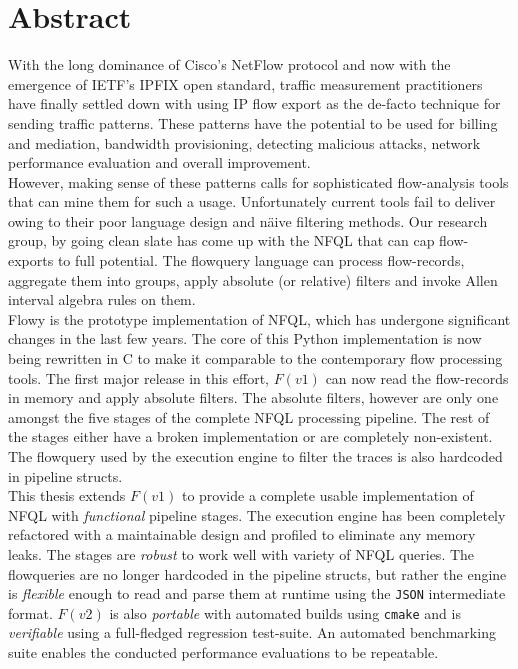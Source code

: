 \begingroup
\let\clearpage\relax
\let\cleardoublepage\relax
\let\cleardoublepage\relax

\chapter*{Abstract}

With the long dominance of Cisco's NetFlow \cite{rfc3954} protocol and now
with the emergence of \ac{IETF}'s \ac{IPFIX} \cite{rfc5101} open standard,
traffic measurement practitioners have finally settled down with using \ac{IP}
flow export as the de-facto technique for sending traffic patterns. These
patterns have the potential to be used for billing and mediation, bandwidth
provisioning, detecting malicious attacks, network performance evaluation and
overall improvement. \\

However, making sense of these patterns calls for sophisticated flow-analysis
tools that can mine them for such a usage. Unfortunately current tools fail to
deliver owing to their poor language design and n\"aive filtering methods. Our
research group, by going clean slate has come up with the \ac{NFQL}
\cite{vmarinov:thesis:2009} that can cap flow-exports to full potential.
The flowquery language can process flow-records, aggregate them into groups,
apply absolute (or relative) filters and invoke Allen interval algebra rules
\cite{fallen:1983} on them. \\

Flowy \cite{kkanev:thesis:2009} is the prototype implementation of \ac{NFQL},
which has undergone significant changes in the last few years.  The core of
this Python implementation is now being rewritten in C to make it comparable
to the contemporary flow processing tools. The first major release in this
effort, $F(v1)$ \cite{jschauer:thesis:2011} can now read the flow-records in
memory and apply absolute filters. The absolute filters, however are only one
amongst the five stages of the complete \ac{NFQL} processing pipeline. The
rest of the stages either have a broken implementation or are completely
non-existent. The flowquery used by the execution engine to filter the traces
is also hardcoded in pipeline structs. \\

This thesis extends $F(v1)$ to provide a complete usable implementation of
\ac{NFQL} with \emph{functional} pipeline stages. The execution engine has
been completely refactored with a maintainable design and profiled to
eliminate any memory leaks. The stages are \emph{robust} to work well with
variety of \ac{NFQL} queries. The flowqueries are no longer hardcoded in the
pipeline structs, but rather the engine is \emph{flexible} enough to read and
parse them at runtime using the \texttt{JSON} intermediate format. $F(v2)$ is
also \emph{portable} with automated builds using \texttt{cmake} and is
\emph{verifiable} using a full-fledged regression test-suite. An automated
benchmarking suite enables the conducted performance evaluations to be
repeatable.

